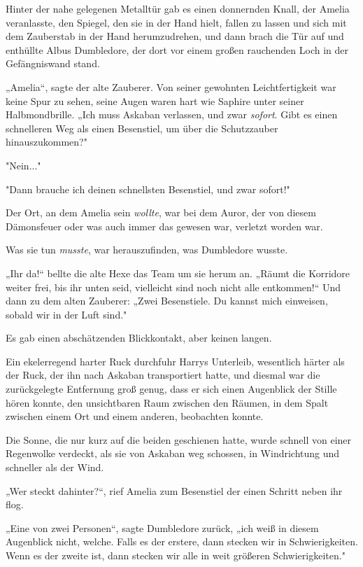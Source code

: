 {Hinter der nahe gelegenen Metalltür gab es einen donnernden Knall, der Amelia veranlasste, den Spiegel, den sie in der Hand hielt, fallen zu lassen und sich mit dem Zauberstab in der Hand herumzudrehen, und dann brach die Tür auf und enthüllte Albus Dumbledore, der dort vor einem großen rauchenden Loch in der Gefängniswand stand.

„Amelia“, sagte der alte Zauberer. Von seiner gewohnten Leichtfertigkeit war keine Spur zu sehen, seine Augen waren hart wie Saphire unter seiner Halbmondbrille. „Ich muss Askaban verlassen, und zwar \emph{sofort}. Gibt es einen schnelleren Weg als einen Besenstiel, um über die Schutzzauber hinauszukommen?"

"Nein..."

"Dann brauche ich deinen schnellsten Besenstiel, und zwar sofort!"

Der Ort, an dem Amelia sein \emph{wollte}, war bei dem Auror, der von diesem Dämonsfeuer oder was auch immer das gewesen war, verletzt worden war.

Was sie tun \emph{musste}, war herauszufinden, was Dumbledore wusste.

„Ihr da!“ bellte die alte Hexe das Team um sie herum an. „Räumt die Korridore weiter frei, bis ihr unten seid, vielleicht sind noch nicht alle entkommen!“ Und dann zu dem alten Zauberer: „Zwei Besenstiele. Du kannst mich einweisen, sobald wir in der Luft sind."

Es gab einen abschätzenden Blickkontakt, aber keinen langen.

Ein ekelerregend harter Ruck durchfuhr Harrys Unterleib, wesentlich härter als der Ruck, der ihn nach Askaban transportiert hatte, und diesmal war die zurückgelegte Entfernung groß genug, dass er sich einen Augenblick der Stille hören konnte, den unsichtbaren Raum zwischen den Räumen, in dem Spalt zwischen einem Ort und einem anderen, beobachten konnte.

Die Sonne, die nur kurz auf die beiden geschienen hatte, wurde schnell von einer Regenwolke verdeckt, als sie von Askaban weg schossen, in Windrichtung und schneller als der Wind.

„Wer steckt dahinter?“, rief Amelia zum Besenstiel der einen Schritt neben ihr flog.

„Eine von zwei Personen“, sagte Dumbledore zurück, „ich weiß in diesem Augenblick nicht, welche. Falls es der erstere, dann stecken wir in Schwierigkeiten. Wenn es der zweite ist, dann stecken wir alle in weit größeren Schwierigkeiten."

}
